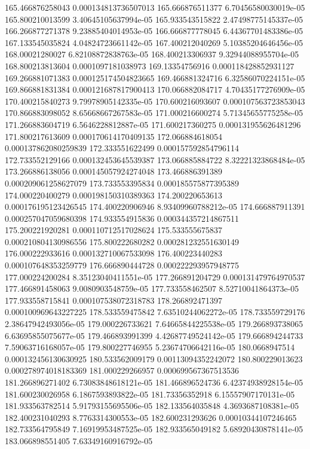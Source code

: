 {165.466876258043 0.000134813736507013
165.666876511377 6.70456580030019e-05
165.800210013599 3.40645105637994e-05
165.933543515822 2.47498775145337e-05
166.266877271378 9.23885404014953e-05
166.666877778045 6.44367701483386e-05
167.133545035824 4.04824723661142e-05
167.400212040269 5.10385204646456e-05
168.00021280027 6.82108872838763e-05
168.400213306937 9.32944088955704e-05
168.800213813604 0.0001097181038973
169.13354756916 0.000118428852931127
169.266881071383 0.000125174504823665
169.466881324716 6.32586070224151e-05
169.866881831384 0.000121687817900413
170.066882084717 4.70435177276909e-05
170.400215840273 9.79978905142335e-05
170.600216093607 0.000107563723853043
170.866883098052 8.65668667267583e-05
171.000216600274 5.71345655775258e-05
171.266883604719 6.5646228812887e-05
171.600217360275 0.000131955626481296
171.800217613609 0.000170614170409135
172.066884618054 0.000137862080259839
172.333551622499 0.000157592854796114
172.733552129166 0.000132453645539387
173.066885884722 8.32221323868484e-05
173.266886138056 0.000145057924274048
173.466886391389 0.000209061258627079
173.733553395834 0.000185575877395389
174.000220400279 0.000198150310389363
174.200220653613 0.000176195123426545
174.400220906946 8.93409960788212e-05
174.666887911391 0.000257047059680398
174.933554915836 0.000344357214867511
175.200221920281 0.000110712517028624
175.533555675837 0.000210804130986556
175.800222680282 0.000281232551630149
176.000222933616 0.000132710067533098
176.400223440283 0.000107648353259779
176.666890444728 0.000222293957948775
177.000224200284 8.35123040411551e-05
177.266891204729 0.000131479764970537
177.466891458063 9.0080903548759e-05
177.733558462507 8.52710041864373e-05
177.933558715841 0.000107538072318783
178.266892471397 0.000100969643227225
178.533559475842 7.63510244062272e-05
178.733559729176 2.38647942493056e-05
179.000226733621 7.64665844225538e-05
179.266893738065 6.63695855075677e-05
179.466893991399 4.42687749524142e-05
179.666894244733 7.59063716168057e-05
179.800227746955 5.23674706642116e-05
180.0668947514 0.000132456130630925
180.533562009179 0.00113094352242072
180.800229013623 0.000278974018183369
181.000229266957 0.000699567367513536
181.266896271402 6.73083848618121e-05
181.466896524736 6.42374938928154e-05
181.600230026958 6.1867593893822e-05
181.73356352918 6.15557907170131e-05
181.933563782514 5.91793155695506e-05
182.133564035848 4.3693687108381e-05
182.400231040293 8.7763314300553e-05
182.600231293626 0.00010344107246465
182.733564795849 7.16919953487525e-05
182.933565049182 5.68920430878141e-05
183.066898551405 7.63349160916792e-05
}
